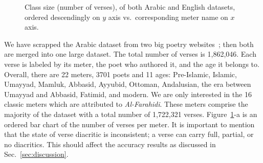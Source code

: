 \documentclass[journal,10pt,twocolumns,letter]{IEEEtran}
\begin{document}
\begin{figure}[!tb]
\caption{\footnotesize Class size (number of verses), of both Arabic and English datasets, ordered
    descendingly on $y$ axis vs.\ corresponding meter name on $x$
    axis.}\label{fig:footn-footn-class}
\end{figure}

We have scrapped the Arabic dataset from two big poetry websites~\citep{diwan,
  PoetryEncyclopedia2016}; then both are merged into one large dataset. The total number of verses
is 1,862,046. Each verse is labeled by its meter, the poet who authored it, and the age it belongs
to. Overall, there are 22 meters, 3701 poets and 11 ages: Pre-Islamic, Islamic, Umayyad, Mamluk,
Abbasid, Ayyubid, Ottoman, Andalusian, the era between Umayyad and Abbasid, Fatimid, and modern. We
are only interested in the 16 classic meters which are attributed to \textit{Al-Farahidi}. These
meters comprise the majority of the dataset with a total number of 1,722,321
verses. Figure~\ref{fig:footn-footn-class}-a is an ordered bar chart of the number of verses per
meter. It is important to mention that the state of verse diacritic is inconsistent; a verse can
carry full, partial, or no diacritics. This should affect the accuracy results as discussed in
Sec.~\ref{sec:discussion}.
\end{document}
